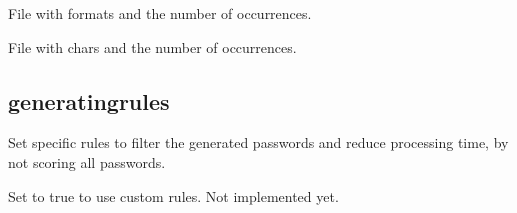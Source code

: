 \documentclass[letterpaper,10pt,english]{sphinxmanual}
\begin{document}

\begin{fulllineitems}
\label{\detokenize{usage:format}}
\sphinxAtStartPar
File with formats and the number of  occurrences.

\begin{sphinxVerbatim}[commandchars=\\\{\}]
  
\end{sphinxVerbatim}

\end{fulllineitems}


\begin{fulllineitems}
\label{\detokenize{usage:char}}
\sphinxAtStartPar
File with chars and the number of  occurrences.

\begin{sphinxVerbatim}[commandchars=\\\{\}]
  
\end{sphinxVerbatim}

\end{fulllineitems}



\subsection{generating\sphinxhyphen{}rules}
\label{\detokenize{usage:generating-rules}}
\sphinxAtStartPar
Set specific rules to filter the generated passwords and reduce processing time, by not scoring all passwords.


\begin{fulllineitems}
\sphinxAtStartPar
Set to true to use custom rules. Not implemented yet.

\begin{sphinxVerbatim}[commandchars=\\\{\}]
  
\end{sphinxVerbatim}

\end{fulllineitems}
\end{document}
